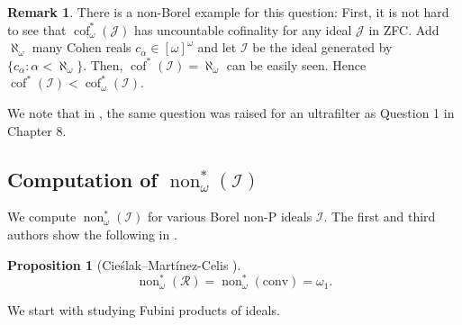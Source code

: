 \documentclass[a4paper,12pt]{amsart}
\newtheorem{prop}[thm]{Proposition}
\theoremstyle{definition}
\newtheorem{rem}[thm]{Remark}
\numberwithin{thm}{section}
\numberwithin{equation}{section}
\renewcommand{\a}{\alpha}
\newcommand{\ooo}{[{\omega}]^\omega}
\DeclareMathOperator{\non}{non}
\DeclareMathOperator{\cof}{cof}
\newcommand{\I}{\mathscr{I}}
\newcommand{\J}{\mathscr{J}}
\newcommand{\conv}{\mathrm{conv}}
\newcommand{\RandomGraph}{\mathcal{R}}
\begin{document}
    \begin{rem}\label{rem:aleph_omega_Cohen}
        There is a non-Borel example for this question:
        First, it is not hard to see that $\cof^*_\omega(\J)$ has uncountable cofinality for any ideal $\J$ in ZFC.
        Add $\aleph_\omega$ many Cohen reals $c_\a \in \ooo$ and let $\I$ be the ideal generated by $\{c_\a:\a<\aleph_\omega\}$. Then, $\cof^*(\I)=\aleph_\omega$ can be easily seen. Hence $\cof^*(\I) < \cof^*_\omega(\I)$. 
    \end{rem}
    
    We note that in \cite{BS99}, the same question was raised for an ultrafilter as Question 1 in Chapter 8.
    

    \subsection{Computation of $\non^*_\omega(\I)$}
    
    We compute $\non^*_\omega(\I)$ for various Borel non-P ideals $\I$. The first and third authors show the following in \cite{CM25}.
    
    \begin{prop}[{Cie\'slak--Mart{\' i}nez-Celis \cite[Proposition 4.7]{CM25}}]\label{prop:nonMI_random_and_conv}
        \[
        \non^*_\omega(\RandomGraph)=\non^*_\omega(\conv) = \omega_1.
        \]
    \end{prop}
    
    We start with studying Fubini products of ideals.
    
\end{document}
